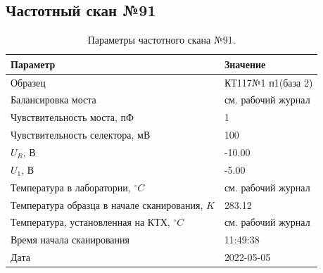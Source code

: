 \subsection{Частотный скан №91}
\begin{table}[!ht]
    \centering
    \caption{Параметры частотного скана №91.}
    \begin{tabular}{|l|l|}
        \hline
        Параметр                                       & Значение                  \\ \hline
        Образец                                        & КТ117№1 п1(база 2)        \\ \hline
        Балансировка моста                             & см. рабочий журнал        \\ \hline
        Чувствительность моста, пФ                     & 1                         \\ \hline
        Чувствительность селектора, мВ                 & 100                       \\ \hline
        $U_R$, В                                       & -10.00                    \\ \hline
        $U_1$, В                                       & -5.00                     \\ \hline
        Температура в лаборатории, $^\circ C$          & см. рабочий журнал        \\ \hline
        Температура образца в начале сканирования, $K$ & 283.12                    \\ \hline
        Температура, установленная на КТХ, $^\circ C$  & см. рабочий журнал        \\ \hline
        Время начала сканирования                      & 11:49:38                  \\ \hline
        Дата                                           & 2022-05-05                \\ \hline
    \end{tabular}
    \label{table:frequency_scan_91}
\end{table}


